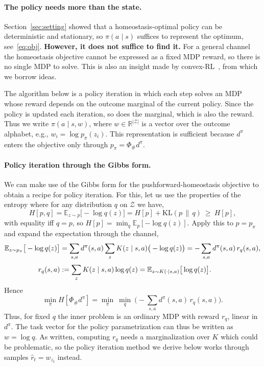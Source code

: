 \documentclass[11pt]{article}
\theoremstyle{remark}
\newcommand{\Zcal}{\mathcal Z}
\newcommand{\E}{\mathbb E}
\newcommand{\1}{\mathds{1}}
\newcommand{\occ}{d^{\pi}}
\newcommand{\push}{\Phi_{\#}}
\newcommand{\pz}{p_{\pi}}
\newcommand{\Hf}[1]{H\!\left[#1\right]}
\begin{document}
\paragraph{The policy needs more than the state.}
Section~\ref{sec:setting} showed that a homeostasis-optimal policy can be deterministic and stationary, so $\pi(a\mid s)$ suffices to represent the optimum, see~\eqref{eq:obj}.
\textbf{However, it does not suffice to find it.}
For a general channel the homeostasis objective cannot be expressed as a fixed MDP reward, so there is no single MDP to solve.
This is also an insight made by convex-RL~\citep{Hazan-provably19,Zahavy-reward21}, from which we borrow ideas.

The algorithm below is a policy iteration in which each step solves an MDP whose reward depends on the outcome marginal of the current policy.
Since the policy is updated each iteration, so does the marginal, which is also the reward.
Thus we write $\pi(a\mid s,w)$, where $w\in\mathbb R^{|\Zcal|}$ is a vector over the outcome alphabet, e.g., $w_i=\log\pz(z_i)$.
This representation is sufficient because $\occ$ enters the objective only through $\pz=\push\occ$.

\paragraph{Policy iteration through the Gibbs form.}
We can make use of the Gibbs form for the pushforward-homeostasis objective to obtain a recipe for policy iteration.
For this, let us use the properties of the entropy where for any distribution $q$ on $\Zcal$ we have,
\begin{equation}
  H[p, q] = \E_{z\sim p}\big[-\log q(z)\big]=\Hf{p}+\mathrm{KL}(p\,\|\,q)\ \ge\ \Hf{p},
  \label{eq:gibbs}
\end{equation}
with equality iff $q=p$, so $\Hf{p}=\min_q\E_{p}[-\log q(z)]$.
Apply this to $p=\pz$ and expand the expectation through the channel,
\begin{align}
  \E_{z\sim\pz}\big[-\log q(z)\big]
  &=\sum_{s,a}\occ(s,a)\sum_z K(z\mid s,a)\big(-\log q(z)\big) =-\sum_{s,a}\occ(s,a)\,r_q(s,a),
  \label{eq:gibbs-reward}\\[2pt]
  r_q(s,a)
  &:=\sum_z K(z\mid s,a)\log q(z) =\E_{z\sim K(\cdot\mid s,a)}\big[\log q(z)\big] . \notag
\end{align}
Hence
\begin{equation}
  \min_{\pi}\Hf{\push\occ}=\min_{\pi}\ \min_{q}\ \Big(-\sum_{s,a}\occ(s,a)\,r_q(s,a)\Big).
  \label{eq:min-min}
\end{equation}
Thus, for fixed $q$ the inner problem is an ordinary MDP with reward $r_q$, linear in $\occ$.
The task vector for the policy parametrization can thus be written as $w=\log q$.
As written, computing $r_q$ needs a marginalization over $K$ which could be problematic, so the policy iteration method we derive below works through samples $\hat{r}_t = w_{z_t}$ instead.
\end{document}
